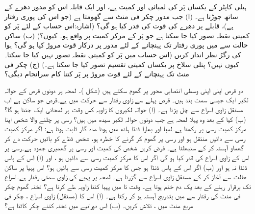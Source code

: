 ہیلی کاپٹر  کے   یکساں پَر  کی لمبائی   اور کمیت  ہے، اور ایک  قابلہ    اس کو    مدور دھرے کے ساتھ  جوڑتا ہے۔ (ا) جب مدور  چکر فی منٹ سے گھومتا ہے  (جو اس کی پوری رفتار ہے)، قابلے پر دھرے کی قوت کی قدر کیا ہو گی؟ (اشارہ:اس حساب کے لئے پَر کو کمیتی  نقطہ تصور کیا جا سکتا ہے جو پَر کے مرکز کمیت پر واقع ہو۔ کیوں؟)  (ب)   ساکن حالت سے  میں پوری رفتار تک  پہنچانے کے لئے  مدور پر درکار قوت مروڑ کیا ہو گی؟ ہوا کی رگڑ نظر انداز کریں (اس حساب میں پَر کو کمیتی نقطہ تصور نہیں کیا جا سکتا۔ کیوں نہیں؟ پتلی سلاخ پر یکساں کمیتی تقسیم تصور کیا جا سکتا ہے۔)  (ج)   چکر فی منٹ تک پہنچانے کے لئے قوت مروڑ  پر پَر کتنا کام سرانجام  دیگی؟

دو قرص  اپنی اپنی    وسطی انتصابی محور پر گھوم سکتے ہیں (شکل )۔ لمحہ  پر  دونوں قرص کے حوالہ لکیر ایک جیسی سمت بند ہیں۔ قرص  پہلے سے  زاوی رفتار سے حرکت میں ہے۔قرص  جو ساکن ہے  اب  مستقل زاوی  اسراع سے چل پڑتا ہے۔ (ا)   حوالہ لکیروں کا زاویہ کس وقت   پر لمحاتی    ایک  جتنا ہو گا؟ (ب)  کیا  کے بعد     وہ پہلا لمحہ ہے جب دونوں حوالہ لکیر  سیدھ میں  ہیں؟
رسی پر چلنے والا  شخص اپنا مرکز کمیت رسی پر رکھتا ہے۔لمبا اور بھارا    ڈنڈا  ہاتھ میں ہونا   مدد گار ثابت ہوتا ہے: اگر   مرکز کمیت رسی سے دائیں  منتقل  ہو اور رسی پر گھوم کر گرنے کا خطرہ ہو،  شخص  ڈنڈے کو بائیں حرکت دے کر  گھماو  آہستہ کر کے سنبھلتا ہے۔ فرض کریں شخص کی کمیت  اور رسی  پر گھمیری جمود  ہے۔رسی پر اس کے  زاوی اسراع  کی قدر کیا ہو گی  اگر اس کا مرکز کمیت رسی سے  دائیں  ہو ، اور (ا) اس کے پاس ڈنڈا نہ ہو اور (ب) اگر اس کے پاس   ڈنڈا ہو جس کا مرکز کمیت رسی سے  بائیں ہو؟
اس پہیا   پر ساکن حالت سے آغاز کر کے مستقل زاوی اسراع  سے گزرتا ہے۔ لمحہ  پر پہیے کی زاوی سمتی رفتار  ہے۔اسراع  تک برقرار رہنے کے بعد یک دم ختم ہوتا ہے۔ وقت  تا  میں پہیا کتنا زاویہ طے کرتا ہے؟
تختہ گھوم   چکر فی منٹ کی رفتار سے  میں بتدریج آہستہ ہو کر رکتا ہے۔ (ا)  اس کا (مستقل)   زاوی اسراع ، چکر فی مربع منٹ میں ، تلاش کریں۔ (ب) اس دورانیے میں تختہ کتنے چکر کاٹتا ہے؟
